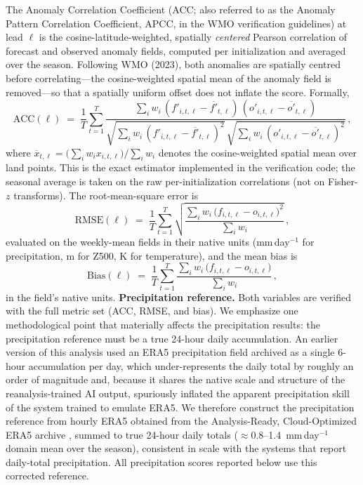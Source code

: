 \documentclass[11pt]{article}
\begin{document}
The Anomaly Correlation Coefficient (ACC; also referred to as the
Anomaly Pattern Correlation Coefficient, APCC, in the WMO verification
guidelines) at lead $\ell$ is the cosine-latitude-weighted, spatially
\emph{centered} Pearson correlation of forecast and observed anomaly
fields, computed per initialization and averaged over the season.
Following WMO (2023), both anomalies are spatially centred before
correlating---the cosine-weighted spatial mean of the anomaly field is
removed---so that a spatially uniform offset does not inflate the score.
Formally,
\begin{equation}
  \mathrm{ACC}(\ell) \;=\; \frac{1}{T}\sum_{t=1}^{T}
  \frac{\sum_i w_i\,(f'_{i,t,\ell}-\overline{f'}_{t,\ell})\,
                     (o'_{i,t,\ell}-\overline{o'}_{t,\ell})}
       {\sqrt{\sum_i w_i\,(f'_{i,t,\ell}-\overline{f'}_{t,\ell})^{2}}\,
        \sqrt{\sum_i w_i\,(o'_{i,t,\ell}-\overline{o'}_{t,\ell})^{2}}}\,,
  \label{eq:acc}
\end{equation}
where $\overline{x}_{t,\ell}=\big(\sum_i w_i x_{i,t,\ell}\big)/\sum_i w_i$
denotes the cosine-weighted spatial mean over land points. This is the
exact estimator implemented in the verification code; the seasonal
average is taken on the raw per-initialization correlations (not on
Fisher-$z$ transforms). The root-mean-square error is
\begin{equation}
  \mathrm{RMSE}(\ell) \;=\; \frac{1}{T}\sum_{t=1}^{T}
  \sqrt{\frac{\sum_i w_i\,\bigl(f_{i,t,\ell}-o_{i,t,\ell}\bigr)^{2}}
             {\sum_i w_i}}\,,
  \label{eq:rmse}
\end{equation}
evaluated on the weekly-mean fields in their native units
(mm\,day$^{-1}$ for precipitation, m for Z500, K for temperature), and
the mean bias is
\begin{equation}
  \mathrm{Bias}(\ell) \;=\; \frac{1}{T}\sum_{t=1}^{T}
  \frac{\sum_i w_i\,\bigl(f_{i,t,\ell}-o_{i,t,\ell}\bigr)}
       {\sum_i w_i}\,,
  \label{eq:bias}
\end{equation}
in the field's native units. \textbf{Precipitation reference.} Both
variables are verified with the full metric set (ACC, RMSE, and bias).
We emphasize one methodological point that materially affects the
precipitation results: the precipitation reference must be a true
24-hour daily accumulation. An earlier version of this analysis used an
ERA5 precipitation field archived as a single 6-hour accumulation per
day, which under-represents the daily total by roughly an order of
magnitude and, because it shares the native scale and structure of the
reanalysis-trained AI output, spuriously inflated the apparent
precipitation skill of the system trained to emulate ERA5. We therefore
construct the precipitation reference from hourly ERA5 obtained from the
Analysis-Ready, Cloud-Optimized ERA5 archive
\citep[ARCO-ERA5;][]{carver2023}, summed to true 24-hour daily totals
($\approx$0.8--1.4~mm\,day$^{-1}$ domain mean over the season),
consistent in scale with the systems that report daily-total
precipitation. All precipitation scores reported below use this
corrected reference.
\end{document}

